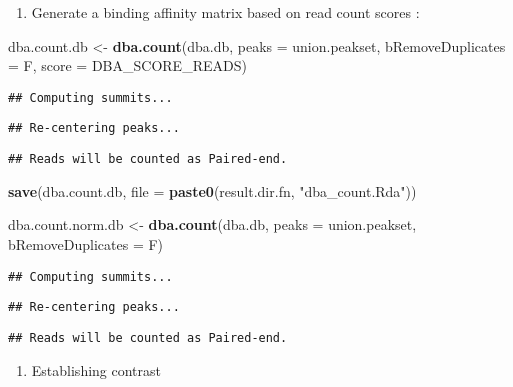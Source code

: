 \documentclass[
]{article}
\newenvironment{Shaded}{\begin{snugshade}}{\end{snugshade}}
\newcommand{\DataTypeTok}[1]{\textcolor[rgb]{0.13,0.29,0.53}{#1}}
\newcommand{\KeywordTok}[1]{\textcolor[rgb]{0.13,0.29,0.53}{\textbf{#1}}}
\newcommand{\NormalTok}[1]{#1}
\newcommand{\StringTok}[1]{\textcolor[rgb]{0.31,0.60,0.02}{#1}}
\providecommand{\tightlist}{%
  \setlength{\itemsep}{0pt}\setlength{\parskip}{0pt}}
\begin{document}
\begin{enumerate}
\def\labelenumi{\arabic{enumi}.}
\setcounter{enumi}{5}
\tightlist
\item
  Generate a binding affinity matrix based on read count scores :
\end{enumerate}

\begin{Shaded}
\begin{Highlighting}[]
\NormalTok{dba.count.db <-}\StringTok{ }\KeywordTok{dba.count}\NormalTok{(dba.db, }\DataTypeTok{peaks =}\NormalTok{ union.peakset, }\DataTypeTok{bRemoveDuplicates =}\NormalTok{ F, }\DataTypeTok{score =}\NormalTok{ DBA_SCORE_READS)  }
\end{Highlighting}
\end{Shaded}

\begin{verbatim}
## Computing summits...
\end{verbatim}

\begin{verbatim}
## Re-centering peaks...
\end{verbatim}

\begin{verbatim}
## Reads will be counted as Paired-end.
\end{verbatim}

\begin{Shaded}
\begin{Highlighting}[]
\KeywordTok{save}\NormalTok{(dba.count.db, }\DataTypeTok{file =} \KeywordTok{paste0}\NormalTok{(result.dir.fn, }\StringTok{"dba_count.Rda"}\NormalTok{))}

\NormalTok{dba.count.norm.db <-}\StringTok{ }\KeywordTok{dba.count}\NormalTok{(dba.db, }\DataTypeTok{peaks =}\NormalTok{ union.peakset, }\DataTypeTok{bRemoveDuplicates =}\NormalTok{ F)  }
\end{Highlighting}
\end{Shaded}

\begin{verbatim}
## Computing summits...
\end{verbatim}

\begin{verbatim}
## Re-centering peaks...
\end{verbatim}

\begin{verbatim}
## Reads will be counted as Paired-end.
\end{verbatim}

\begin{enumerate}
\def\labelenumi{\arabic{enumi}.}
\setcounter{enumi}{6}
\tightlist
\item
  Establishing contrast
\end{enumerate}
\end{document}
